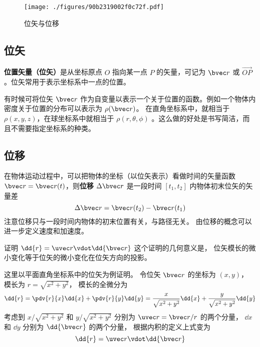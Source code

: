 

\begin{figure}[ht]
\centering
\texttt{[image: ./figures/90b2319002f0c72f.pdf]}
\caption{位矢与位移} \label{fig_Disp_1}
\end{figure}

\subsection{位矢}

\textbf{位置矢量（位矢）}是从坐标原点 $O$ 指向某一点 $P$ 的矢量，可记为 $\bvec r$ 或 $\overrightarrow{OP}$。位矢常用于表示坐标系中一点的位置。

有时候可将位矢 $\bvec r$ 作为自变量以表示一个关于位置的函数。例如一个物体内密度关于位置的分布可以表示为 $\rho(\bvec r)$。 在直角坐标系中，就相当于 $\rho(x,y,z)$，在球坐标系中就相当于 $\rho(r,\theta,\phi)$ 。这么做的好处是书写简洁，而且不需要指定坐标系的种类。

\subsection{位移}
在物体运动过程中，可以把物体的坐标（以位矢表示）看做时间的矢量函数 $\bvec r=\bvec r(t)$，则\textbf{位移} $\Delta \bvec r$ 是一段时间 $[t_1,t_2]$ 内物体初末位矢的矢量差
\begin{equation}
\Delta \bvec r = \bvec r(t_2) - \bvec r(t_1)
\end{equation}
注意位移只与一段时间内物体的初末位置有关，与路径无关。 由位移的概念可以进一步定义速度和加速度。


\begin{example}{证明 $\dd{r} = \uvec r \vdot \dd{\bvec r}$}\label{ex_Disp_1}
这个证明的几何意义是， 位矢模长的微小变化等于位矢的微小变化在位矢方向的投影。

这里以平面直角坐标系中的位矢为例证明。 令位矢 $\bvec r$ 的坐标为 $(x, y)$， 模长为 $r = \sqrt{x^2 + y^2}$，
模长的全微分为
\begin{equation}
\dd{r} = \pdv{r}{x} \dd{x} + \pdv{r}{y} \dd{y} = \frac{x}{\sqrt{x^2 + y^2}} \dd{x} + \frac{y}{\sqrt{x^2 + y^2}} \dd{y}
\end{equation}
考虑到 $x/\sqrt{x^2 + y^2}$ 和 $y/\sqrt{x^2 + y^2}$ 分别为 $\uvec r = \bvec r/r$ 的两个分量， $\dd{x}$ 和 $\dd{y}$ 分别为 $\dd{\bvec r}$ 的两个分量， 根据内积的定义上式变为
\begin{equation}
\dd{r} = \uvec r \vdot \dd{\bvec r}
\end{equation}
\end{example}
